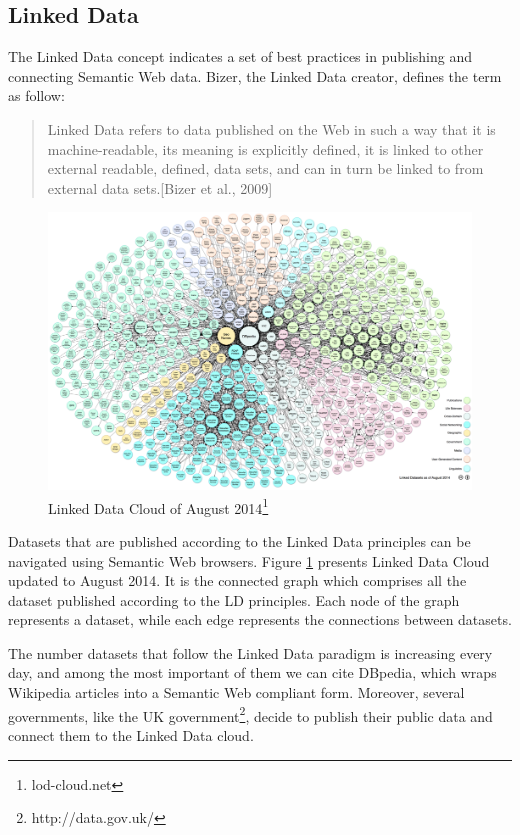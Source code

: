 \subsection{Linked Data}\label{sec:ldata}

The Linked Data concept indicates a set of best practices in publishing and connecting Semantic Web data. Bizer, the Linked Data creator, defines the term as follow:

\begin{quote}
Linked Data refers to data published on the Web in such a way that it is machine-readable, its meaning is explicitly defined, it is linked to other external readable, defined, data sets, and can in turn be linked to from external data sets.[Bizer et al., 2009]
\end{quote} 

\begin{figure}[tbh]
  \centering
	\includegraphics[width=\linewidth]{images/lod}
	\caption[Linked Data Cloud]{Linked Data Cloud of August 2014\footnote{lod-cloud.net}} 
  	\label{fig:lod}
\end{figure}

Datasets that are published according to the Linked Data principles can be navigated using Semantic Web browsers. Figure \ref{fig:lod} presents  Linked Data Cloud updated to August 2014. It is the connected graph which comprises all the dataset published according to the LD principles. Each node of the graph represents a dataset, while each edge represents the connections between datasets.

The number datasets that follow the Linked Data paradigm is increasing every day, and among the most important of them we can cite DBpedia, which wraps Wikipedia articles into a Semantic Web compliant form. Moreover, several governments, like the UK government\footnote{http://data.gov.uk/}, decide to publish their public data and connect them to the Linked Data cloud. 

